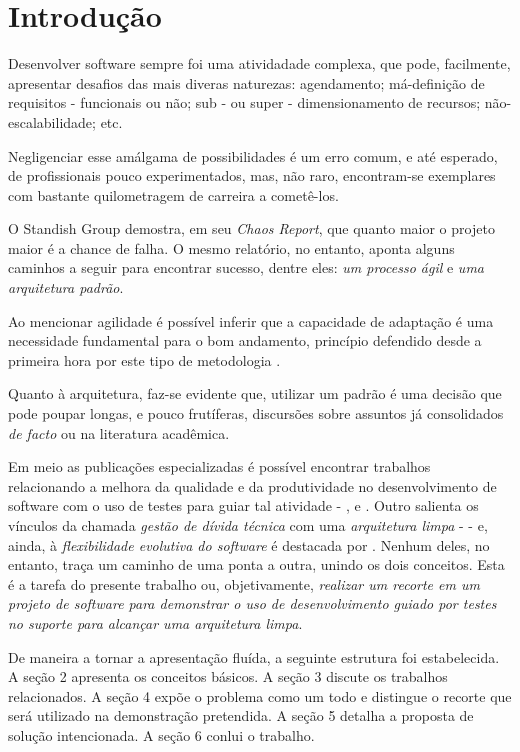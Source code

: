 \section{Introdução}

  Desenvolver software sempre foi uma atividadade complexa, que pode, facilmente,  apresentar desafios das mais diveras naturezas: agendamento; má-definição de  requisitos - funcionais ou não; sub - ou super - dimensionamento de recursos; não-escalabilidade; etc.

  Negligenciar esse amálgama de possibilidades é um erro comum, e até esperado, de profissionais pouco experimentados, mas, não raro, encontram-se exemplares com bastante quilometragem de carreira a cometê-los.

  O Standish Group demostra, em seu \emph{Chaos Report}\cite{ChaosReport2015}, que quanto maior o projeto maior é a chance de falha. O mesmo relatório, no entanto, aponta alguns caminhos a seguir para encontrar sucesso, dentre eles: \emph{um processo ágil} e \emph{uma arquitetura padrão}.

  Ao mencionar agilidade é possível inferir que a capacidade de adaptação é uma  necessidade fundamental para o bom andamento, princípio defendido desde a  primeira hora por este tipo de metodologia \cite{ManifestoAgil2001}.

  Quanto à arquitetura, faz-se evidente que, utilizar um padrão é uma decisão que pode poupar longas, e pouco frutíferas, discursões sobre assuntos já consolidados \emph{de facto} ou na literatura acadêmica.

  Em meio as publicações especializadas é possível encontrar trabalhos relacionando a melhora da qualidade e da produtividade no desenvolvimento de software com o uso de testes para guiar tal atividade - \cite{Moggi2011}, \cite{Filho2012} e \cite{Benato2021}. Outro salienta os vínculos da chamada \emph{gestão de dívida técnica} com uma \emph{arquitetura limpa} - \cite{Beltrao2020} - e, ainda, à \emph{flexibilidade evolutiva do software} é destacada por \cite{Souza2021}. Nenhum deles, no entanto, traça um caminho de uma ponta a outra, unindo os dois conceitos. Esta é a tarefa do presente trabalho ou, objetivamente, \emph{realizar um recorte em um projeto de software para demonstrar o uso de desenvolvimento guiado por testes no suporte para alcançar uma arquitetura limpa}.

  De maneira a tornar a apresentação fluída, a seguinte estrutura foi estabelecida. A seção 2 apresenta os conceitos básicos. A seção 3 discute os trabalhos relacionados. A seção 4 expõe o problema como um todo e distingue o recorte que será utilizado na demonstração pretendida. A seção 5 detalha a proposta de solução intencionada. A seção 6 conlui o trabalho.
